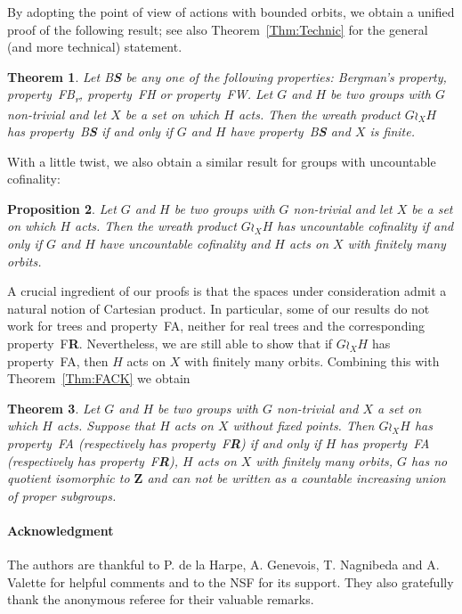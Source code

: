 \documentclass[a4paper]{article}
\newtheorem{mainthm}{Theorem}
\newtheorem{mainprop}[mainthm]{Proposition}
\theoremstyle{definition}
\newcommand*{\field}[1]{\mathbf{#1}}
\newcommand*{\Z}{\field{Z}}
\newcommand*{\BS}{B\textbf{S}}
\newcommand*{\FB}{FB\textsubscript{r}}
\newcommand*{\FH}{FH}
\newcommand*{\FW}{FW}
\newcommand*{\FA}{FA}
\newcommand*{\FR}{F\textbf{R}}
\begin{document}
By adopting the point of view of actions with bounded orbits, we obtain a unified proof of the following result; see also Theorem~\ref{Thm:Technic} for the general (and more technical) statement.
%
%
\begin{mainthm}\label{Thm:Main}
Let \BS{} be any one of the following properties: Bergman's property, property~\FB, property~\FH{} or property~\FW.
Let $G$ and $H$ be two groups with $G$ non-trivial and let $X$ be a set on which $H$ acts.
Then the wreath product $G \wr_X H$ has property~\BS{} if and only if $G$ and $H$ have property~\BS{} and $X$ is finite.
\end{mainthm}
%
%
With a little twist, we also obtain a similar result for groups with uncountable cofinality:
\begin{mainprop}\label{Prop:UncCoun}
Let $G$ and $H$ be two groups with $G$ non-trivial and let $X$ be a set on which $H$ acts.
Then the wreath product $G \wr_X H$ has uncountable cofinality if and only if $G$ and $H$ have uncountable cofinality and $H$ acts on $X$ with finitely many orbits.
\end{mainprop}
%
%
A crucial ingredient of our proofs is that the spaces under consideration admit a natural notion of Cartesian product.
In particular, some of our results do not work for trees and property~\FA, neither for real trees and the corresponding property~\FR.
Nevertheless, we are still able to show that if $G\wr_XH$ has property~\FA, then $H$ acts on $X$ with finitely many orbits.
Combining this with Theorem~\ref{Thm:FACK} we obtain
\begin{mainthm}\label{Thm:FAFiniteOrbits}
Let $G$ and $H$ be two groups with $G$ non-trivial and $X$ a set on which $H$ acts. Suppose that $H$ acts on $X$ without fixed points.
Then $G\wr_XH$ has property~\FA{} (respectively has property~\FR) if and only if $H$ has property~\FA{} (respectively has property~\FR), $H$ acts on $X$ with finitely many orbits, $G$ has no quotient isomorphic to $\Z$ and can not be written as a countable increasing union of proper subgroups.
\end{mainthm}
%
%
%
%
%
%
\paragraph{Acknowledgment}
The authors are thankful to P. de la Harpe, A. Genevois, T. Nagnibeda and A. Valette for helpful comments and to the NSF for its support.
They also gratefully  thank the anonymous referee for their valuable remarks.
%
%
%
%
%
%
%
%
%
%
%
%
%
\end{document}
